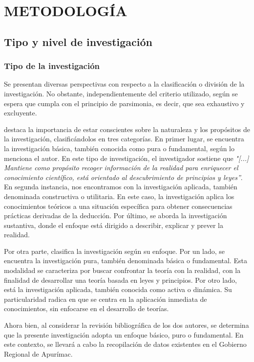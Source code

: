 \pagestyle{headings}
\chapter{METODOLOGÍA}
\section{Tipo y nivel de investigación}
\subsection{Tipo de la investigación}

Se presentan diversas perspectivas con respecto a la clasificación o división de la investigación. No obstante, independientemente del criterio utilizado, según \cite[]{Zacarias2020} se espera que cumpla con el principio de parsimonia, es decir, que sea exhaustivo y excluyente.

\cite[47]{SanchezCarlessi2015} destaca la importancia de estar conscientes sobre la naturaleza y los propósitos de la investigación, clasificándolos en tres categorías. En primer lugar, se encuentra la investigación básica, también conocida como pura o fundamental, según lo menciona el autor. En este tipo de investigación, el investigador sostiene que \emph{"[...] Mantiene como propósito recoger información de la realidad para enriquecer el conocimiento científico, está orientado al descubrimiento de principios y leyes”}. En segunda instancia, nos encontramos con la investigación aplicada, también denominada constructiva o utilitaria. En este caso, la investigación aplica los conocimientos teóricos a una situación específica para obtener consecuencias prácticas derivadas de la deducción. Por último, se aborda la investigación sustantiva, donde el enfoque está dirigido a describir, explicar y prever la realidad.

Por otra parte, \cite[36]{Tamayo2004} clasifica la investigación según su enfoque. Por un lado, se encuentra la investigación pura, también denominada básica o fundamental. Esta modalidad se caracteriza por buscar confrontar la teoría con la realidad, con la finalidad de desarrollar una teoría basada en leyes y principios. Por otro lado, está la investigación aplicada, también conocida como activa o dinámica. Su particularidad radica en que se centra en la aplicación inmediata de conocimientos, sin enfocarse en el desarrollo de teorías.

Ahora bien, al considerar la revisión bibliográfica de los dos autores, se determina que la presente investigación adopta un enfoque básico, puro o fundamental. En este contexto, se llevará a cabo la recopilación de datos existentes en el Gobierno Regional de Apurímac.
